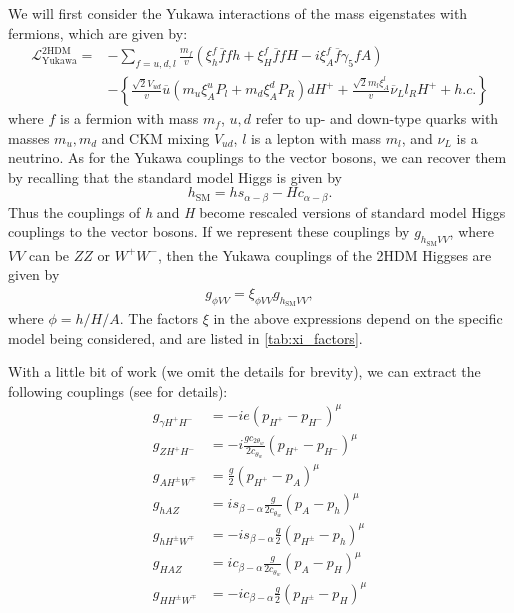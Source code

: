 We will first consider the Yukawa interactions of the mass eigenstates with fermions, which are given by:
\begin{align*}
\mathcal{L}^{\mathrm{2HDM}}_{\text{Yukawa}} =& - \sum_{f = u, d, l} \frac{m_f}{v}
\left(\xi_h^f \overline{f}fh+\xi_H^f \overline{f}fH-i\xi_A^f \overline{f}\gamma_5fA \right)\\
&-\left\{\frac{\sqrt{2}V_{ud}}{v}\overline{u}\left(m_u\xi_A^uP_l+m_d\xi_A^dP_R\right)dH^+ + \frac{\sqrt{2}m_l\xi^l_A}{v}\overline{\nu}_Ll_RH^+ + h.c.\right\}
\end{align*}
where $f$ is a fermion with mass $m_f$, $u,d$ refer to up- and down-type quarks with masses $m_u,m_d$ and CKM mixing $V_{ud}$, $l$ is a lepton with mass $m_l$, and $\nu_L$ is a neutrino. 
As for the Yukawa couplings to the vector bosons, we can recover them by recalling that the standard model Higgs is given by
\begin{equation}
h_\text{SM} = hs_{\alpha-\beta}-Hc_{\alpha-\beta}.
\end{equation}
Thus the couplings of \emph{h} and \emph{H} become rescaled versions of standard model Higgs couplings to the vector bosons. If we represent these couplings by $g_{h_\text{SM}VV}$, where $VV$ can be $ZZ$ or $W^+W^-$, then the Yukawa couplings of the 2HDM Higgses are given by
\begin{align}
g_{\phi VV} = \xi_{\phi VV}g_{h_\text{SM}VV},
\end{align}
where $\phi = h/H/A$. The factors $\xi$ in the above expressions depend on the specific model being considered, and are listed in \autoref{tab:xi_factors}.

With a little bit of work (we omit the details for brevity), we can extract the following couplings (see \citep{Kling2016a} for details):
\begin{align*}
g_{\gamma H^+H^-} &= -ie(p_{H^+}-p_{H^-})^\mu\\
g_{ZH^+H^-} &= -i\frac{gc_{2\theta_w}}{2c_{\theta_w}}(p_{H^+}-p_{H^-})^\mu\\
g_{AH^\pm W^\mp} &= \frac{g}{2}(p_{H^+}-p_{A})^\mu\\
g_{hAZ} &= is_{\beta-\alpha}\frac{g}{2c_{\theta_w}}(p_A-p_h)^\mu\\
g_{hH^\pm W^\mp} &= -is_{\beta-\alpha}\frac{g}{2}(p_{H^\pm}-p_h)^\mu\\
g_{HAZ} &= ic_{\beta-\alpha}\frac{g}{2c_{\theta_w}}(p_A-p_H)^\mu\\
g_{HH^\pm W^\mp} &= -ic_{\beta-\alpha}\frac{g}{2}(p_{H^\pm}-p_H)^\mu\\
\end{align*}

